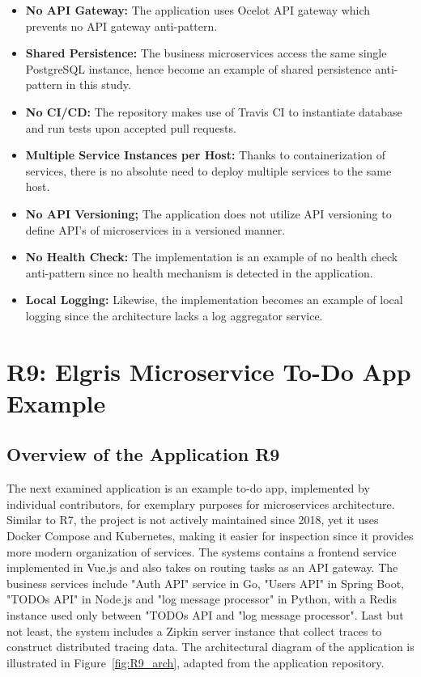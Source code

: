 \documentclass{Configuration_Files/PoliMi3i_thesis}
\begin{document}
\begin{itemize}
    \item \textbf{No API Gateway:} The application uses Ocelot API gateway which prevents no API gateway anti-pattern.
    
    \item \textbf{Shared Persistence:} The business microservices access the same single PostgreSQL instance, hence become an example of shared persistence anti-pattern in this study.
    
    \item \textbf{No CI/CD:} The repository makes use of Travis CI to instantiate database and run tests upon accepted pull requests.
    
    \item \textbf{Multiple Service Instances per Host:} Thanks to containerization of services, there is no absolute need to deploy multiple services to the same host.
    
    \item \textbf{No API Versioning;} The application does not utilize API versioning to define API's of microservices in a versioned manner.
    
    \item \textbf{No Health Check:} The implementation is an example of no health check anti-pattern since no health mechanism is detected in the application.
    
    \item \textbf{Local Logging:} Likewise, the implementation becomes an example of local logging since the architecture lacks a log aggregator service.
\end{itemize}

\section{R9: Elgris Microservice To-Do App Example}
\label{sec:R9}

\subsection{Overview of the Application R9}
\label{subsec:R9_overview}

The next examined application is an example to-do app, implemented by individual contributors, for exemplary purposes for microservices architecture.
Similar to R7, the project is not actively maintained since 2018, yet it uses Docker Compose and Kubernetes, making it easier for inspection since it provides more modern organization of services.
The systems contains a frontend service implemented in Vue.js and also takes on routing tasks as an API gateway.
The business services include "Auth API" service in Go, "Users API" in Spring Boot, "TODOs API" in Node.js and "log message processor" in Python, with a Redis instance used only between "TODOs API and "log message processor".
Last but not least, the system includes a Zipkin server instance that collect traces to construct distributed tracing data.
The architectural diagram of the application is illustrated in Figure~\ref{fig:R9_arch}, adapted from the application repository.
\end{document}
